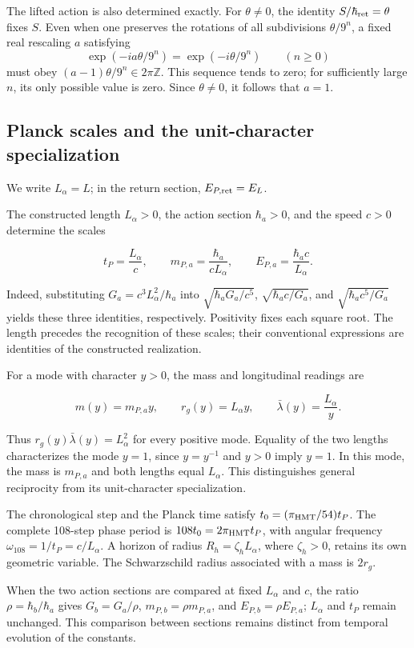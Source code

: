 The lifted action is also determined exactly. For \(\theta\ne0\),
the identity \(S/\hbar_{\rm ret}=\theta\) fixes \(S\).
Even when one preserves the rotations of all subdivisions
\(\theta/9^n\), a fixed real rescaling \(a\) satisfying
\[
 \exp(-ia\theta/9^n)=\exp(-i\theta/9^n)
 \qquad(n\geq0)
\]
must obey \((a-1)\theta/9^n\in2\pi\mathbb Z\). This sequence
tends to zero; for sufficiently large \(n\), its only possible
value is zero. Since \(\theta\ne0\), it follows that \(a=1\).

\subsection{Planck scales and the unit-character specialization}

We write \(L_\alpha=L\); in the return section, \(E_{P,\rm ret}=E_L\).

The constructed length $L_\alpha>0$, the action section $\hbar_a>0$, and
the speed $c>0$ determine the scales

\[
t_P=\frac{L_\alpha}{c},\qquad
m_{P,a}=\frac{\hbar_a}{cL_\alpha},\qquad
E_{P,a}=\frac{\hbar_a c}{L_\alpha}.
\]

Indeed, substituting $G_a=c^3L_\alpha^2/\hbar_a$ into
$\sqrt{\hbar_aG_a/c^5}$, $\sqrt{\hbar_ac/G_a}$, and
$\sqrt{\hbar_ac^5/G_a}$ yields these three identities, respectively.
Positivity fixes each square root. The length precedes the recognition of
these scales; their conventional expressions are identities of the
constructed realization.

For a mode with character $y>0$, the mass and longitudinal readings are

\[
m(y)=m_{P,a}y,\qquad r_g(y)=L_\alpha y,\qquad
\bar\lambda(y)=\frac{L_\alpha}{y}.
\]

Thus $r_g(y)\bar\lambda(y)=L_\alpha^2$ for every positive mode. Equality
of the two lengths characterizes the mode $y=1$, since $y=y^{-1}$ and
$y>0$ imply $y=1$. In this mode, the mass is $m_{P,a}$ and both lengths
equal $L_\alpha$. This distinguishes general reciprocity from its
unit-character specialization.

The chronological step and the Planck time satisfy
$t_0=(\pi_{\rm HMT}/54)t_P$. The complete 108-step phase period is
$108t_0=2\pi_{\rm HMT}t_P$, with angular frequency
$\omega_{108}=1/t_P=c/L_\alpha$. A horizon of radius
$R_h=\zeta_hL_\alpha$, where $\zeta_h>0$, retains its own geometric
variable. The Schwarzschild radius associated with a mass is $2r_g$.

When the two action sections are compared at fixed $L_\alpha$ and $c$,
the ratio $\rho=\hbar_b/\hbar_a$ gives
$G_b=G_a/\rho$, $m_{P,b}=\rho m_{P,a}$, and
$E_{P,b}=\rho E_{P,a}$; $L_\alpha$ and $t_P$ remain unchanged.
This comparison between sections remains distinct from temporal evolution
of the constants.

